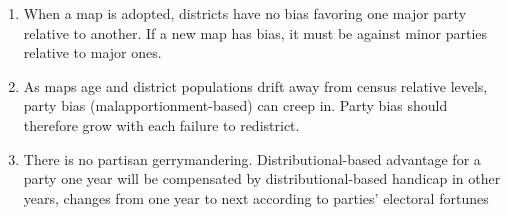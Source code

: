 \documentclass[letter,12pt]{article}
\begin{document}
\begin{enumerate}

\item When a map is adopted, districts have no bias favoring one major party relative to another. If a new map has bias, it must be against minor parties relative to major ones. 

\item As maps age and district populations drift away from census relative levels, party bias (malapportionment-based) can creep in. Party bias should therefore grow with each failure to redistrict. 

\item There is no partisan gerrymandering. Distributional-based advantage for a party one year will be compensated by distributional-based handicap in other years, changes from one year to next according to parties' electoral fortunes

\end{enumerate}








\end{document}
